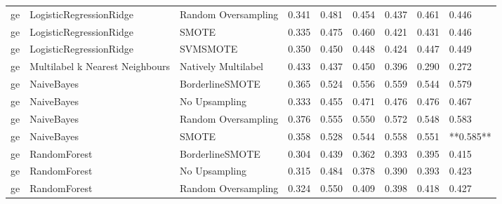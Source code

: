 \begin{tabular}{lllllllll}
      ge &         LogisticRegressionRidge &           Random Oversampling & 0.341 &                     0.481 &                 0.454 &                  0.437 &                                   0.461 &     0.446 \\
      ge &         LogisticRegressionRidge &                         SMOTE & 0.335 &                     0.475 &                 0.460 &                  0.421 &                                   0.431 &     0.446 \\
      ge &         LogisticRegressionRidge &                      SVMSMOTE & 0.350 &                     0.450 &                 0.448 &                  0.424 &                                   0.447 &     0.449 \\
      ge & Multilabel k Nearest Neighbours &           Natively Multilabel & 0.433 &                     0.437 &                 0.450 &                  0.396 &                                   0.290 &     0.272 \\
      ge &                      NaiveBayes &               BorderlineSMOTE & 0.365 &                     0.524 &                 0.556 &                  0.559 &                                   0.544 &     0.579 \\
      ge &                      NaiveBayes &                 No Upsampling & 0.333 &                     0.455 &                 0.471 &                  0.476 &                                   0.476 &     0.467 \\
      ge &                      NaiveBayes &           Random Oversampling & 0.376 &                     0.555 &                 0.550 &                  0.572 &                                   0.548 &     0.583 \\
      ge &                      NaiveBayes &                         SMOTE & 0.358 &                     0.528 &                 0.544 &                  0.558 &                                   0.551 & **0.585** \\
      ge &                    RandomForest &               BorderlineSMOTE & 0.304 &                     0.439 &                 0.362 &                  0.393 &                                   0.395 &     0.415 \\
      ge &                    RandomForest &                 No Upsampling & 0.315 &                     0.484 &                 0.378 &                  0.390 &                                   0.393 &     0.423 \\
      ge &                    RandomForest &           Random Oversampling & 0.324 &                     0.550 &                 0.409 &                  0.398 &                                   0.418 &     0.427 \\

\end{tabular}
